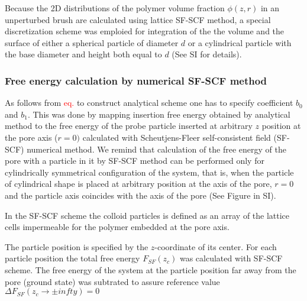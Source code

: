 \documentclass[12pt, a4paper]{article}
\newcommand\todo[1]{\textcolor{red}{#1}}
\begin{document}
Because the 2D distributions of the polymer volume fraction $\phi(z,r)$ in an unperturbed brush are calculated using lattice SF-SCF method, a special discretization scheme was emploied for integration 
of the the volume and the surface of either a spherical particle of diameter $d$ or a cylindrical particle with the base diameter and height both equal to $d$ (See SI for details).


\subsubsection{Free energy calculation by numerical SF-SCF method}
As follows from \todo{eq.} to construct analytical scheme one has to specify coefficient $b_0$ and $b_1$.
This was done by mapping insertion free energy obtained by analytical method 
to the free energy of the probe particle inserted at arbitrary $z$ position at the pore axis ($r=0)$ 
calculated with Scheutjens-Fleer self-consistent field (SF-SCF) numerical method.
We remind that calculation of the free energy of the pore with a particle in it by SF-SCF method  can be performed only 
for cylindrically symmetrical configuration of the system, that is, when the particle of cylindrical shape is placed at arbitrary position at the axis of the pore, $r=0$ and
the particle axis coincides with the axis of the pore (See Figure in SI).
  

In the SF-SCF scheme the colloid particles is defined as an array of the lattice cells impermeable for the polymer embedded at the pore axis.

The particle position is specified by the $z$-coordinate of its center. 
For each particle position the total free energy $F_{SF}(z_c)$ was calculated with SF-SCF scheme. 
The free energy of the system at the particle position far away from the pore (ground state) was subtrated to 
assure reference value $\Delta F_{SF}(z_c \rightarrow \pm infty) = 0$
\end{document}
